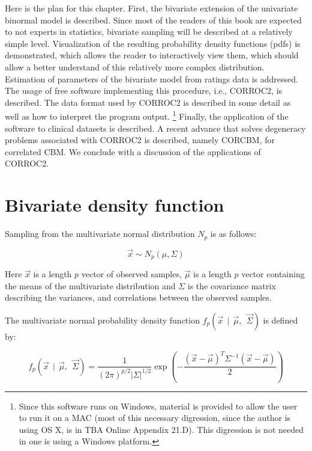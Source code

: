 \documentclass[
]{book}
\begin{document}
Here is the plan for this chapter. First, the bivariate extension of the univariate binormal model is described. Since most of the readers of this book are expected to not experts in statistics, bivariate sampling will be described at a relatively simple level. Visualization of the resulting probability density functions (pdfs) is demonstrated, which allows the reader to interactively view them, which should allow a better understand of this relatively more complex distribution. Estimation of parameters of the bivariate model from ratings data is addressed. The usage of free software implementing this procedure, i.e., CORROC2, is described. The data format used by CORROC2 is described in some detail as well as how to interpret the program output. \footnote{Since this software runs on Windows, material is provided to allow the user to run it on a MAC (most of this necessary digression, since the author is using OS X, is in TBA Online Appendix 21.D). This digression is not needed in one is using a Windows platform.} Finally, the application of the software to clinical datasets is described. A recent advance that solves degeneracy problems associated with CORROC2 is described, namely CORCBM, for correlated CBM. We conclude with a discussion of the applications of CORROC2.

\hypertarget{bivariate-binormal-model-bivariate-density}{%
\section{Bivariate density function}\label{bivariate-binormal-model-bivariate-density}}

Sampling from the multivariate normal distribution \(N_p\) is as follows:

\begin{equation}
\overrightarrow{x} \sim  N_p\left( \mu, \Sigma \right)
\label{eq:multivariate-sampling-model}
\end{equation}

Here \(\overrightarrow{x}\) is a length \(p\) vector of observed samples, \(\overrightarrow{\mu}\) is a length \(p\) vector containing the means of the multivariate distribution and \(\Sigma\) is the covariance matrix describing the variances, and correlations between the observed samples.

The multivariate normal probability density function \(f_p\left( \overrightarrow{x} ~~ \bigg \rvert ~~\overrightarrow{\mu}, ~~ \overrightarrow{\Sigma} \right)\) is defined by:

\begin{equation} 
f_p\left( \overrightarrow{x} ~~ \bigg \rvert ~~\overrightarrow{\mu}, ~~ \overrightarrow{\Sigma} \right)
= \frac{1}{\left( 2 \pi \right)^{p/2}|\Sigma|^{1/2}}\exp\left( -\frac{\left( \overrightarrow{x}-\overrightarrow{\mu} \right)^T \Sigma^{-1} \left( \overrightarrow{x}-\overrightarrow{\mu} \right)}{2} \right)
\label{eq:bivariate-binormal-model-density-function-multivariate}
\end{equation}
\end{document}
